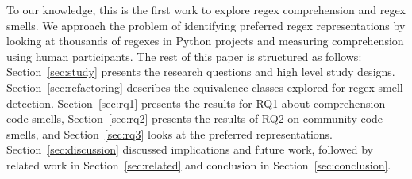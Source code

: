 To our knowledge, this is the first work to explore regex comprehension and regex smells. We approach the problem of identifying preferred regex representations by looking at thousands of regexes in Python projects and measuring comprehension using human participants.  %
The rest of this paper is structured as follows: 
Section~\ref{sec:study} presents the research questions and high level study designs. 
Section~\ref{sec:refactoring} describes the equivalence classes explored for regex smell detection. 
Section~\ref{sec:rq1} presents the results for RQ1 about comprehension code smells, 
Section~\ref{sec:rq2} presents the results of RQ2 on community code smells, and 
Section~\ref{sec:rq3} looks at the preferred representations. 
Section~\ref{sec:discussion} discussed implications and future work, followed by related work in Section~\ref{sec:related} and conclusion in Section~\ref{sec:conclusion}. 
%
